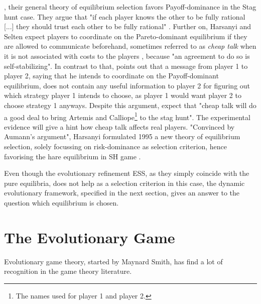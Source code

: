 \documentclass[11pt]{article}
\begin{document}
\textcite{harsanyi_general_1988}, their general theory of equilibrium 
selection favors Payoff-dominance in the Stag hunt case. They argue that
"if each player knows the other to be fully rational [...] they should trust
each other to be fully rational" \parencite[89]{harsanyi_general_1988}.
Further on, Harsanyi and Selten expect players to coordinate on the
Pareto-dominant equilibrium if they are allowed to communicate beforehand,
sometimes referred to as \textit{cheap talk} when it is not associated with
costs to the players \textcite{farrell_cheap_1996}, 
because "an agreement to do so is self-stabilizing". 
In contrast to that,
\textcite{aumann_nash_1990} points out that a message from player 1 to 
player 2, saying that he intends to coordinate on the Payoff-dominant 
equilibrium, does not contain any useful information to player 2 for 
figuring out which strategy player 1 intends to choose, as player 1 would
want player 2 to choose strategy 1 anyways. Despite this argument, 
\textcite[114]{farrell_cheap_1996} expect that 
"cheap talk will do a good deal to
bring Artemis and Calliope\footnote{The names
\textcite{farrell_cheap_1996} used for player 1 and player 2.} 
to the stag hunt". The experimental evidence will give a hint how cheap
talk affects real players. 
"Convinced by Aumann's argument", Harsanyi formulated 1995 a new theory
of equilibrium selection, solely focussing on risk-dominance as selection
criterion, hence favorising the hare equilibrium in SH game 
\parencite[92,94,96]{harsanyi_new_1995}. 

Even though the evolutionary refinement ESS, as they simply coincide with
the pure equilibria, does not help as a selection
criterion in this case, the dynamic evolutionary framework, specified in the
next section, gives an answer to the question which equilibrium is chosen. 

\section{The Evolutionary Game}
\label{evolutionarysection}
Evolutionary game theory, started by Maynard Smith, has find a lot of 
recognition in the game theory literature. 
\end{document}
